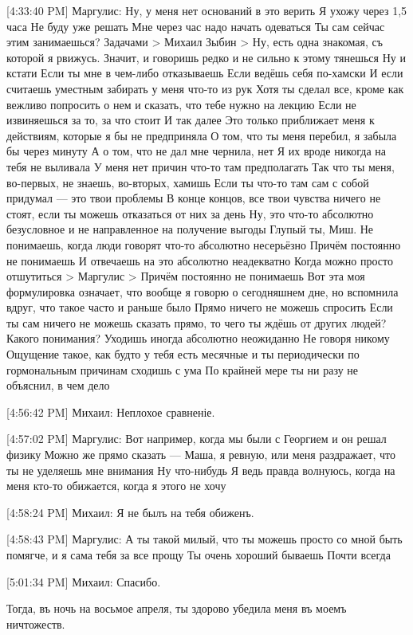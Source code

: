 \documentclass{article}
\newcommand{\yat}{{\fontencoding{X2}\selectfont\cyryat}} %
\begin{document}
[4:33:40 PM] Маргулис:
Ну, у меня нет оснований в это верить
 Я ухожу через 1,5 часа
 Не буду уже решать
 Мне через час надо начать одеваться
 Ты сам сейчас этим занимаешься?
 Задачами
> Михаил Зыбин
> Ну, есть одна знакомая, съ которой я р вижусь.
Значит, и говоришь редко и не сильно к этому тянешься
 Ну и кстати
 Если ты мне в чем-либо отказываешь
 Если ведёшь себя по-хамски
 И если считаешь уместным забирать у меня что-то из рук
 Хотя ты сделал все, кроме как вежливо попросить о нем и сказать, что тебе нужно на лекцию
 Если не извиняешься за то, за что стоит
 И так далее
 Это только приближает меня к действиям, которые я бы не предприняла
 О том, что ты меня перебил, я забыла бы через минуту
 А о том, что не дал мне чернила, нет
 Я их вроде никогда на тебя не выливала
 У меня нет причин что-то там предполагать
 Так что ты меня, во-первых, не знаешь, во-вторых, хамишь
 Если ты что-то там сам с собой придумал — это твои проблемы
 В конце концов, все твои чувства ничего не стоят, если ты можешь отказаться от них за день
 Ну, это что-то абсолютно безусловное и не направленное на получение выгоды
 Глупый ты, Миш.
 Не понимаешь, когда люди говорят что-то абсолютно несерьёзно
 Причём постоянно не понимаешь
 И отвечаешь на это абсолютно неадекватно
 Когда можно просто отшутиться
> Маргулис
> Причём постоянно не понимаешь
Вот эта моя формулировка означает, что вообще я говорю о сегодняшнем дне, но вспомнила вдруг, что такое часто и раньше было
 Прямо ничего не можешь спросить
 Если ты сам ничего не можешь сказать прямо, то чего ты ждёшь от других людей? Какого понимания?
 Уходишь иногда абсолютно неожиданно
 Не говоря никому
 Ощущение такое, как будто у тебя есть месячные и ты периодически по гормональным причинам сходишь с ума
 По крайней мере ты ни разу не объяснил, в чем дело

[4:56:42 PM] Михаил:
Неплохое сравненіе.

[4:57:02 PM] Маргулис:
Вот например, когда мы были с Георгием и он решал физику
 Можно же прямо сказать — Маша, я ревную, или меня раздражает, что ты не уделяешь мне внимания
 Ну что-нибудь
 Я ведь правда волнуюсь, когда на меня кто-то обижается, когда я этого не хочу

[4:58:24 PM] Михаил:
Я не былъ на тебя обиженъ.

[4:58:43 PM] Маргулис:
А ты такой милый, что ты можешь просто со мной быть помягче, и я сама тебя за все прощу
 Ты очень хороший бываешь
 Почти всегда

[5:01:34 PM] Михаил:
Спасибо. 

Тогда, въ ночь на восьмое апреля, ты здорово убедила меня въ моемъ ничтожеств\yat.
\end{document}
